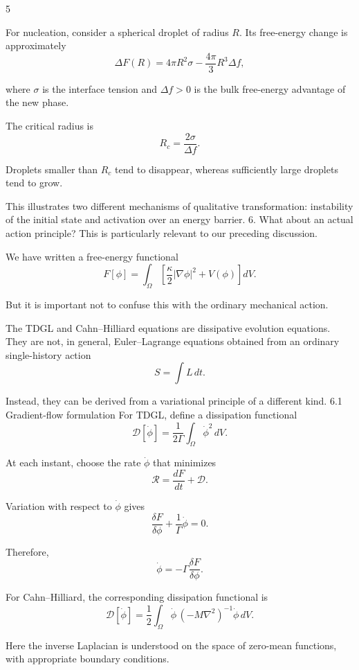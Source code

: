 5











For nucleation, consider a spherical droplet of radius \(R\). Its free-energy change is approximately
\[
\Delta F(R)
=
4\pi R^2\sigma
-\frac{4\pi}{3}R^3\Delta f,
\]

where \(\sigma\) is the interface tension and \(\Delta f>0\) is the bulk free-energy advantage of the new phase.

The critical radius is
\[
\boxed{
R_c=\frac{2\sigma}{\Delta f}.
}
\]

Droplets smaller than \(R_c\) tend to disappear, whereas sufficiently large droplets tend to grow.

This illustrates two different mechanisms of qualitative transformation: instability of the initial state and activation over an energy barrier.
6. What about an actual action principle?
This is particularly relevant to our preceding discussion.

We have written a free-energy functional
\[
F[\phi]=\int_\Omega
\left[
\frac{\kappa}{2}|\nabla\phi|^2+V(\phi)
\right]dV.
\]

But it is important not to confuse this with the ordinary mechanical action.

The TDGL and Cahn–Hilliard equations are dissipative evolution equations. They are not, in general, Euler–Lagrange equations obtained from an ordinary single-history action
\[
S=\int L\,dt.
\]

Instead, they can be derived from a variational principle of a different kind.
6.1 Gradient-flow formulation
For TDGL, define a dissipation functional
\[
\mathcal D[\dot\phi]
=
\frac{1}{2\Gamma}
\int_\Omega \dot\phi^2\,dV.
\]

At each instant, choose the rate \(\dot\phi\) that minimizes
\[
\mathcal R=
\frac{dF}{dt}+\mathcal D.
\]

Variation with respect to \(\dot\phi\) gives
\[
\frac{\delta F}{\delta\phi}
+\frac{1}{\Gamma}\dot\phi=0.
\]

Therefore,
\[
\boxed{
\dot\phi=-\Gamma\frac{\delta F}{\delta\phi}.
}
\]

For Cahn–Hilliard, the corresponding dissipation functional is
\[
\mathcal D[\dot\phi]
=
\frac12\int_\Omega
\dot\phi\,(-M\nabla^2)^{-1}\dot\phi\,dV.
\]

Here the inverse Laplacian is understood on the space of zero-mean functions, with appropriate boundary conditions.

